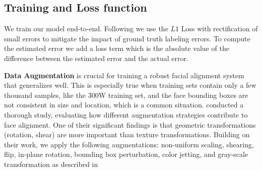 \documentclass[twocolumn]{article}
\begin{document}
\subsection{Training and Loss function}

We train our model end-to-end.
Following \cite{feng2019rectified} we use the $L1$ Loss with rectification of small errors to mitigate the impact of ground truth labeling errors. To compute the estimated error we add a loss term which is the absolute value of the difference between the estimated error and the actual error.


\textbf{Data Augmentation} is crucial for training a robust facial alignment system that generalizes well. This is especially true when training sets contain only a few thousand samples, like the 300W training set, and the face bounding boxes are not consistent in size and location, which is a common situation. \cite{ feng2019mining} conducted a thorough study, evaluating how different augmentation strategies contribute to face alignment. One of their significant findings is that geometric transformations (rotation, shear) are more important than texture transformations. Building on their work, we apply the following augmentations: non-uniform scaling, shearing, flip, in-plane rotation, bounding box perturbation, color jetting, and gray-scale transformation as described in \cite{ feng2019mining}

\iffalse
\textbf{Data Augmentation} is crucial for training a robust facial alignment system that generalizes well. This is especially true when training sets contain only a few thousand samples, like the 300W training set, and the face bounding boxes are not consistent in size and location, which is a common situation. \cite{ feng2019mining} conducted a thorough study, evaluating how different augmentation strategies contribute to face alignment. One of their significant findings is that geometric transformations (rotation, shear) are more important than texture transformations. Building on their work, we apply the following augmentations in probability 0.5: scaling factor is uniformly selected between [0.6, 1.4], shearing parameter sampled uniformly from [-0.3, 0.3], flip, in-plane rotation chosen uniformly from [-30, 30]. We also add bounding perturbation, color jetting, and gray-scale transformation as described in \cite{ feng2019mining}
\fi
\end{document}
